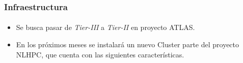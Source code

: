\frame
{
\frametitle{Infraestructura}
\framesubtitle{}
\begin{itemize}
\item Se busca pasar de \emph{Tier-III} a \emph{Tier-II} en proyecto ATLAS.

\item En los próximos meses se instalará un nuevo Cluster parte del proyecto NLHPC, 
que cuenta con las siguientes características.

\end{itemize}
\begin{table}[h]
\centering
{}
\caption{Características del Cluster Proyecto NLHPC}
\end{table}

}
